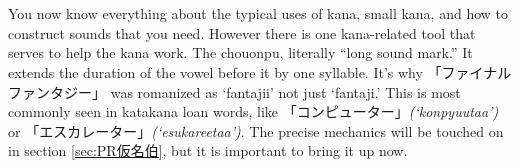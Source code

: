 \section[長音符]{}\label{sec:PR仮名長音符}

You now know everything about the typical uses of kana, small kana, and how to construct sounds that you need. However there is one kana-related tool that serves to help the kana work. The chouonpu, literally ``long sound mark.'' It extends the duration of the vowel before it by one syllable. It's why 「ファイナルファンタジー」 was romanized as `fantajii' not just `fantaji.' This is most commonly seen in katakana loan words, like 「コンピューター」\textit{(`konpyuutaa')} or 「エスカレーター」\textit{(`esukareetaa')}. The precise mechanics will be touched on in section \ref{sec:PR仮名伯}, but it is important to bring it up now.
